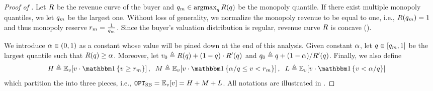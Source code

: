 \begin{proof}[Proof of ]
    Let $R$ be the revenue curve of the buyer and $q_m\in \operatorname{argmax}_{q}R(q)$ be the monopoly quantile. If there exist multiple monopoly quantiles, we let $q_m$ be the largest one. Without loss of generality, we normalize the monopoly revenue to be equal to one, i.e., $R(q_m) = 1$ and thus monopoly reserve $r_m = \frac{1}{q_m}$. Since the buyer's valuation distribution is regular, revenue curve $R$ is concave ().
    
     We introduce $\alpha\in(0, 1)$ as a constant whose value will be pined down at the end of this analysis. Given constant $\alpha$, let $q\in[q_m, 1]$ be the largest quantile such that $R(q) \geq \alpha$. Moreover, let $v_0 \triangleq R(q) + (1-q)\cdot R'(q)$ and $q_0 \triangleq q + (1 - \alpha) / R'(q)$. Finally, we also define 
    \begin{align*}
        H &\triangleq \expect[\val]{\val\cdot \indicator{\val \geq \optreserve}},
        \;\;
        M \triangleq \expect[\val]{\val\cdot \indicator{\revratio/\quant \leq \val < \optreserve}},
        \;\;
        L \triangleq \expect[\val]{\val\cdot \indicator{ \val < \revratio/\quant}}
    \end{align*}
    which partition the {\SecondBest} into three pieces, i.e., $\OPTSB = \expect[\val]{\val} = H + M + L$. All notations are illustrated in .


\end{proof}
